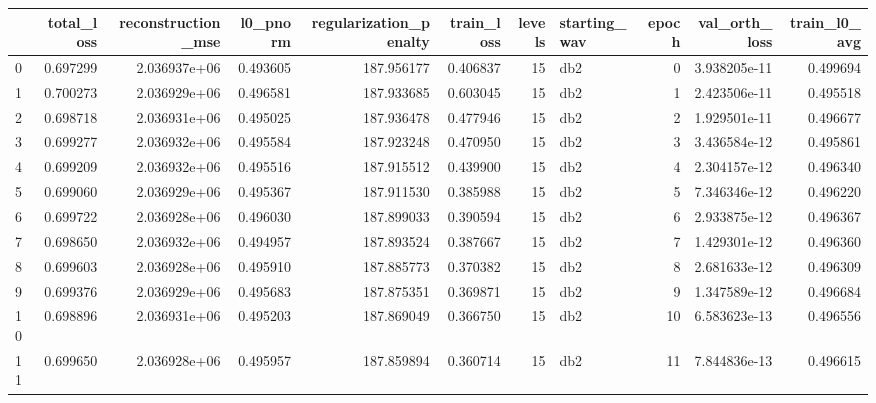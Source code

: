 \begin{tabular}{lrrrrrrlrrr}
\toprule
{} &  total\_loss &  reconstruction\_mse &  l0\_pnorm &  regularization\_penalty &  train\_loss &  levels & starting\_wav &  epoch &  val\_orth\_loss &  train\_l0\_avg \\
\midrule
0    &    0.697299 &        2.036937e+06 &  0.493605 &              187.956177 &    0.406837 &      15 &          db2 &      0 &   3.938205e-11 &      0.499694 \\
1    &    0.700273 &        2.036929e+06 &  0.496581 &              187.933685 &    0.603045 &      15 &          db2 &      1 &   2.423506e-11 &      0.495518 \\
2    &    0.698718 &        2.036931e+06 &  0.495025 &              187.936478 &    0.477946 &      15 &          db2 &      2 &   1.929501e-11 &      0.496677 \\
3    &    0.699277 &        2.036932e+06 &  0.495584 &              187.923248 &    0.470950 &      15 &          db2 &      3 &   3.436584e-12 &      0.495861 \\
4    &    0.699209 &        2.036932e+06 &  0.495516 &              187.915512 &    0.439900 &      15 &          db2 &      4 &   2.304157e-12 &      0.496340 \\
5    &    0.699060 &        2.036929e+06 &  0.495367 &              187.911530 &    0.385988 &      15 &          db2 &      5 &   7.346346e-12 &      0.496220 \\
6    &    0.699722 &        2.036928e+06 &  0.496030 &              187.899033 &    0.390594 &      15 &          db2 &      6 &   2.933875e-12 &      0.496367 \\
7    &    0.698650 &        2.036932e+06 &  0.494957 &              187.893524 &    0.387667 &      15 &          db2 &      7 &   1.429301e-12 &      0.496360 \\
8    &    0.699603 &        2.036928e+06 &  0.495910 &              187.885773 &    0.370382 &      15 &          db2 &      8 &   2.681633e-12 &      0.496309 \\
9    &    0.699376 &        2.036929e+06 &  0.495683 &              187.875351 &    0.369871 &      15 &          db2 &      9 &   1.347589e-12 &      0.496684 \\
10   &    0.698896 &        2.036931e+06 &  0.495203 &              187.869049 &    0.366750 &      15 &          db2 &     10 &   6.583623e-13 &      0.496556 \\
11   &    0.699650 &        2.036928e+06 &  0.495957 &              187.859894 &    0.360714 &      15 &          db2 &     11 &   7.844836e-13 &      0.496615 \\

\end{tabular}
